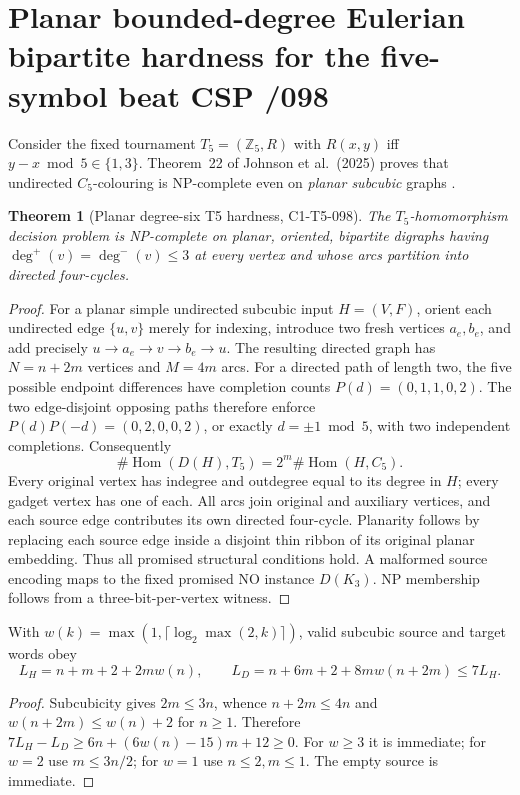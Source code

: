\documentclass[11pt]{article}
\newtheorem{theorem}{Theorem}
\begin{document}
\section{Planar bounded-degree Eulerian bipartite hardness for the five-symbol beat CSP /098}
Consider the fixed tournament $T_5=(\mathbb Z_5,R)$ with
$R(x,y)$ iff $y-x\bmod5\in\{1,3\}$. Theorem~22 of
Johnson et al.\ (2025) proves that undirected $C_5$-colouring
is NP-complete even on \emph{planar subcubic} graphs
\cite{johnson2025}.

\begin{theorem}[Planar degree-six T5 hardness, C1-T5-098]
The $T_5$-homomorphism decision problem is NP-complete on
planar, oriented, bipartite digraphs having
$\deg^+(v)=\deg^-(v)\le3$ at every vertex and whose arcs
partition into directed four-cycles.
\end{theorem}
\begin{proof}
For a planar simple undirected subcubic input $H=(V,F)$,
orient each undirected edge $\{u,v\}$ merely for indexing,
introduce two fresh vertices $a_e,b_e$, and add precisely
$u\to a_e\to v\to b_e\to u$. The resulting directed graph has
$N=n+2m$ vertices and $M=4m$ arcs.
For a directed path of length two, the five possible endpoint
differences have completion counts
$P(d)=(0,1,1,0,2)$. The two edge-disjoint opposing paths
therefore enforce $P(d)P(-d)=(0,2,0,0,2)$, or exactly
$d=\pm1\bmod5$, with two independent completions.
Consequently
\[
\#\operatorname{Hom}(D(H),T_5)=
2^m\#\operatorname{Hom}(H,C_5).
\]
Every original vertex has indegree and outdegree equal to its
degree in $H$; every gadget vertex has one of each. All arcs
join original and auxiliary vertices, and each source edge
contributes its own directed four-cycle. Planarity follows
by replacing each source edge inside a disjoint thin ribbon
of its original planar embedding. Thus all promised
structural conditions hold. A malformed source encoding
maps to the fixed promised NO instance $D(K_3)$.
NP membership follows from a three-bit-per-vertex witness.
\end{proof}
\begin{corollary}
With $w(k)=\max(1,\lceil\log_2\max(2,k)\rceil)$, valid
subcubic source and target words obey
\[
L_H=n+m+2+2mw(n),\qquad
L_D=n+6m+2+8mw(n+2m)\le7L_H.
\]
\end{corollary}
\begin{proof}
Subcubicity gives $2m\le3n$, whence $n+2m\le4n$ and
$w(n+2m)\le w(n)+2$ for $n\ge1$. Therefore
$7L_H-L_D\ge6n+(6w(n)-15)m+12\ge0$.
For $w\ge3$ it is immediate; for $w=2$ use
$m\le3n/2$; for $w=1$ use $n\le2,m\le1$.
The empty source is immediate.
\end{proof}
\end{document}

